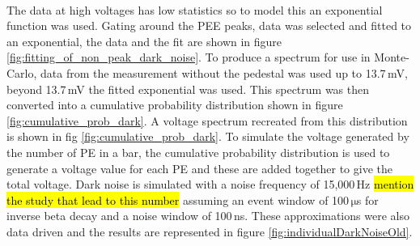 \\The data at high voltages has low statistics so to model this an exponential function was used. Gating around the PEE peaks, data was selected and fitted to an exponential, the data and the fit are shown in figure \ref{fig:fitting_of_non_peak_dark_noise}. To produce a spectrum for use in Monte-Carlo, data from the measurement without the pedestal was used up to 13.7\,mV, beyond 13.7\,mV the fitted exponential was used. This spectrum was then converted into a cumulative probability distribution shown in figure \ref{fig:cumulative_prob_dark}. A voltage spectrum recreated from this distribution is shown in fig \ref{fig:cumulative_prob_dark}. To simulate the voltage generated by the number of PE in a bar, the cumulative probability distribution is used to generate a voltage value for each PE and these are added together to give the total voltage. Dark noise is simulated with a noise frequency of 15,000\,Hz \hl{mention the study that lead to this number} assuming an event window of 100\,$\mathrm{\mu}$s for inverse beta decay and a noise window of 100\,ns. These approximations were also data driven and the results are represented in figure \ref{fig:individualDarkNoiseOld}.
